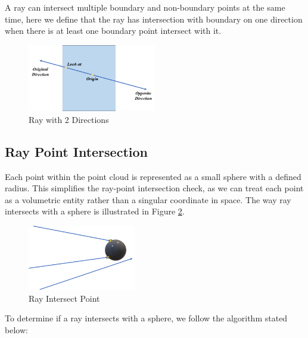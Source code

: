 \documentclass[11pt, a4paper,oneside,chapterprefix=false]{scrbook}
\begin{document}
\vspace{10pt}

A ray can intersect multiple boundary and non-boundary points at the same time, here we define that the ray has intersection with boundary on one direction when there is at least one boundary point intersect with it.

\begin{figure}[H]
    \centering
    \includegraphics*[width=0.5\textwidth]{figures/ray with two directions.png}
    \caption{Ray with 2 Directions}
    \label{fig:ray with 2 directions}
\end{figure}

\subsection{Ray Point Intersection} \label{ray point intersection}

Each point within the point cloud is represented as a small sphere with a defined radius. This simplifies the ray-point intersection check, as we can treat each point as a volumetric entity rather than a singular coordinate in space. The way ray intersects with a sphere is illustrated in Figure \ref{fig:ray intersect point}. 

\begin{figure}[H]
    \centering
    \includegraphics*[width=0.42\textwidth]{figures/ray intersect point.png}
    \caption{Ray Intersect Point}
    \label{fig:ray intersect point}
\end{figure}

To determine if a ray intersects with a sphere, we follow the algorithm \cite{scratchapixel2023} stated below:
\end{document}

